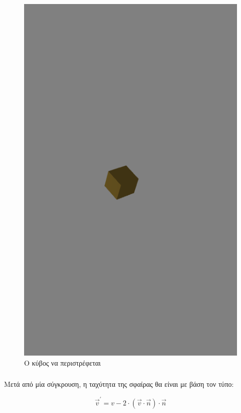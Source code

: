 \documentclass[11pt]{scrartcl} %
\begin{document}
\begin{figure}[H]
	\begin{center}
		\includegraphics[height=.5\textheight]{./assets/cube.png}
	\end{center}
	\caption{Ο κύβος να περιστρέφεται}
\end{figure}

\subsubsection{}

Μετά από μία σύγκρουση, η ταχύτητα της σφαίρας θα είναι με βάση τον τύπο:

\begin{equation}
	\vec{v}^\prime = v - 2 \cdot (\vec{v} \cdot \vec{n}) \cdot \vec{n}	
\end{equation}
\end{document}
